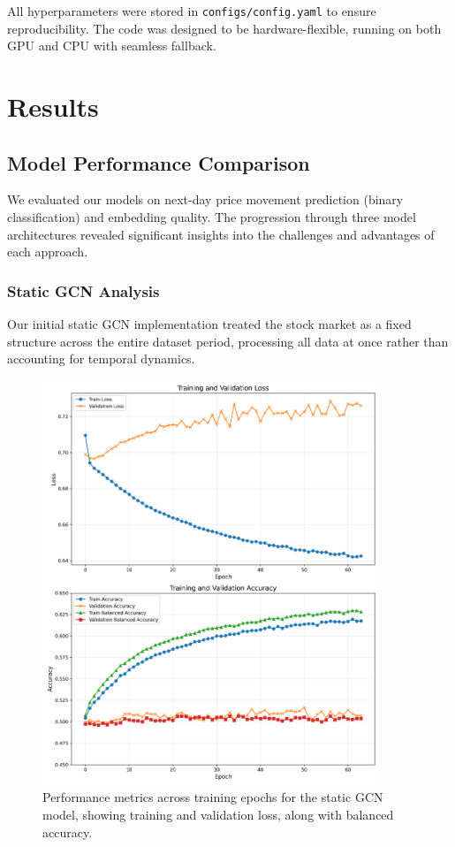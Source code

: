 \documentclass[12pt]{article}
\begin{document}
All hyperparameters were stored in \texttt{configs/config.yaml} to ensure reproducibility. The code was designed to be hardware-flexible, running on both GPU and CPU with seamless fallback.

\section{Results}

\subsection{Model Performance Comparison}

We evaluated our models on next-day price movement prediction (binary classification) and embedding quality. The progression through three model architectures revealed significant insights into the challenges and advantages of each approach.

\subsubsection{Static GCN Analysis}

Our initial static GCN implementation treated the stock market as a fixed structure across the entire dataset period, processing all data at once rather than accounting for temporal dynamics.

\begin{figure}[h]
    \centering
    \includegraphics[width=0.9\textwidth]{../models/gcn/plots/expanded_metrics_plot.png}
    \caption{Performance metrics across training epochs for the static GCN model, showing training and validation loss, along with balanced accuracy.}
    \label{fig:static_gcn_metrics}
\end{figure}
\end{document}
